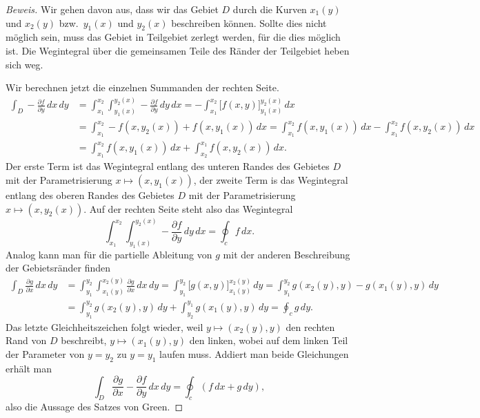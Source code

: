 \begin{proof}[Beweis]
Wir gehen davon aus, dass wir das Gebiet $D$ durch die Kurven $x_1(y)$
und $x_2(y)$ bzw.~$y_1(x)$ und $y_2(x)$ beschreiben können.
Sollte dies nicht möglich sein, muss das Gebiet in Teilgebiet zerlegt
werden, für die dies möglich ist.
Die Wegintegral über die gemeinsamen Teile des Ränder der Teilgebiet 
heben sich weg.

Wir berechnen jetzt die einzelnen Summanden der rechten Seite.
\begin{align*}
\int_D -\frac{\partial f}{\partial y}\,dx\,dy
&=
\int_{x_1}^{x_2}
\int_{y_1(x)}^{y_2(x)} -\frac{\partial f}{\partial y}\,dy \,dx
=
-\int_{x_1}^{x_2} \biggl[f(x,y)\biggr]_{y_1(x)}^{y_2(x)} 
\,dx
\\
&=
\int_{x_1}^{x_2} -f(x,y_2(x))+f(x,y_1(x))\,dx
=
\int_{x_1}^{x_2} f(x,y_1(x))\,dx - \int_{x_1}^{x_2} f(x,y_2(x))\,dx
\\
&=
\int_{x_1}^{x_2} f(x,y_1(x))\,dx + \int_{x_2}^{x_1} f(x,y_2(x))\,dx.
\end{align*}
Der erste Term ist das Wegintegral entlang des unteren Randes des
Gebietes $D$ mit der Parametrisierung $x\mapsto(x,y_1(x))$,
der zweite Term is das Wegintegral entlang des oberen Randes des
Gebietes $D$ mit der Parametrisierung $x\mapsto(x,y_2(x))$.
Auf der rechten Seite steht also das Wegintegral 
\[
\int_{x_1}^{x_2}
\int_{y_1(x)}^{y_2(x)} -\frac{\partial f}{\partial y}\,dy \,dx
=
\oint_c f\,dx.
\]
Analog kann man für die partielle Ableitung von $g$ mit der anderen
Beschreibung der Gebietsränder finden
\begin{align*}
\int_D \frac{\partial g}{\partial x}\,dx\,dy
&=
\int_{y_1}^{y_2}
\int_{x_1(y)}^{x_2(y)} \frac{\partial g}{\partial x}\,dx\,dy
=
\int_{y_1}^{y_2} \biggl[g(x,y)\biggr]_{x_1(y)}^{x_2(y)} \,dy
=
\int_{y_1}^{y_2} g(x_2(y),y) - g(x_1(y),y) \,dy
\\
&=
\int_{y_1}^{y_2} g(x_2(y),y) \,dy + \int_{y_2}^{y_1} g(x_1(y),y)\,dy
=
\oint_c g\,dy.
\end{align*}
Das letzte Gleichheitszeichen folgt wieder, weil $y\mapsto (x_2(y),y)$ den
rechten Rand von $D$ beschreibt, $y\mapsto (x_1(y),y)$ den linken,
wobei auf dem linken Teil der Parameter von $y=y_2$ zu $y=y_1$
laufen muss.
Addiert man beide Gleichungen erhält man
\[
\int_D \frac{\partial g}{\partial x}-\frac{\partial f}{\partial y}\,dx\,dy
=
\oint_c (f\,dx + g\,dy),
\]
also die Aussage des Satzes von Green.
\end{proof}

